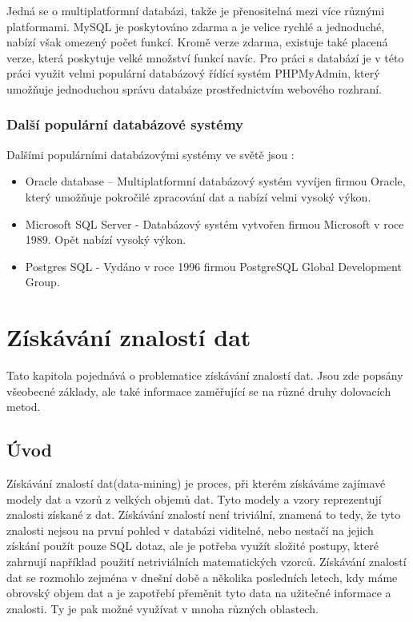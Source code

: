 Jedná se o multiplatformní databázi, takže je přenositelná mezi více různými platformami. MySQL je poskytováno zdarma a je velice rychlé a jednoduché, nabízí však omezený počet funkcí. Kromě verze zdarma, existuje také placená verze, která poskytuje velké množství funkcí navíc. Pro práci s databází je v této práci využit velmi populární databázový řídící systém PHPMyAdmin, který umožňuje jednoduchou správu databáze prostřednictvím webového rozhraní. \cite{mysql2} 


\subsection{Další populární databázové systémy }

Dalšími populárními databázovými systémy ve světě jsou \cite{dbpopular}: 

\begin{itemize}
\item Oracle database – Multiplatformní databázový systém vyvíjen firmou Oracle, který umožňuje pokročilé zpracování dat a nabízí velmi vysoký výkon.
\item Microsoft SQL Server - Databázový systém vytvořen firmou Microsoft v roce 1989. Opět nabízí vysoký výkon. 
\item Postgres SQL - Vydáno v roce 1996 firmou PostgreSQL Global Development Group.

\end{itemize}


\chapter{Získávání znalostí dat}
\label{zzn}

Tato kapitola pojednává o problematice získávání znalostí dat. Jsou zde popsány všeobecné základy, ale také informace zaměřující se na různé druhy dolovacích metod.

\section{Úvod}

Získávání znalostí dat(data-mining) je proces, při kterém získáváme zajímavé modely dat a vzorů z velkých objemů dat. Tyto modely a vzory reprezentují znalosti získané z dat. Získávání znalostí není triviální, znamená to tedy, že tyto znalosti nejsou na první pohled v databázi viditelné, nebo nestačí na jejich získání použít pouze SQL dotaz, ale je potřeba využít složité postupy, které zahrnují například použití netriviálních matematických vzorců.
Získávání znalostí dat se rozmohlo zejména v dnešní době a několika posledních letech, kdy máme obrovský objem dat a je zapotřebí přeměnit tyto data na užitečné informace a znalosti. Ty je pak možné využívat v mnoha různých oblastech. \cite[Kapitola~1]{Kamber}


